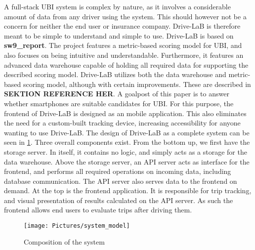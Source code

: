 A full-stack UBI system is complex by nature, as it involves a considerable amount of data from any driver using the system. This should however not be a concern for neither the end user or insurance company. Drive-LaB is therefore meant to be simple to understand and simple to use.
Drive-LaB is based on \textbf{sw9_report}. The project features a metric-based scoring model for UBI, and also focuses on being intuitive and understandable. Furthermore, it features an advanced data warehouse capable of holding all required data for supporting the described scoring model. Drive-LaB utilizes both the data warehouse and metric-based scoring model, although with certain improvements. These are described in \textbf{SEKTION REFERENCE HER}.
A goalpost of this paper is to answer whether smartphones are suitable candidates for UBI. For this purpose, the frontend of Drive-LaB is designed as an mobile application. This also eliminates the need for a custom-built tracking device, increasing accessibility for anyone wanting to use Drive-LaB.
The design of Drive-LaB as a complete system can be seen in \ref{fig:system_model}. Three overall components exist. From the bottom up, we first have the storage server. In itself, it contains no logic, and simply acts as a storage for the data warehouse. Above the storage server, an API server acts as interface for the frontend, and performs all required operations on incoming data, including database communication. The API server also serves data to the frontend on demand. At the top is the frontend application. It is responsible for trip tracking, and visual presentation of results calculated on the API server. As such the frontend allows end users to evaluate trips after driving them.

\begin{figure}[tb]
\centering
\texttt{[image: Pictures/system\_model]}
\caption{Composition of the system}
\label{fig:system_model}
\end{figure}